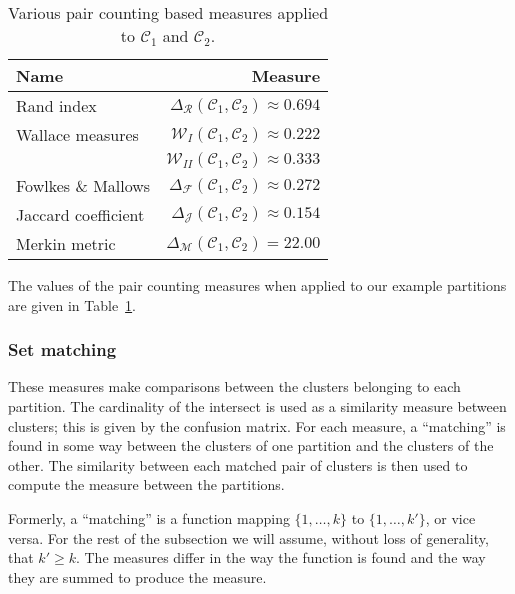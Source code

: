 \documentclass[a4paper]{report}
\newcommand{\clus}{\mathcal{C}}
\newcommand{\partcompare}[1]{\Delta_{\mathcal{#1}}(\clus_1,\clus_2)}
\begin{document}
\begin{table}
  \centering
  \begin{tabular}{lr}
    \toprule
    Name & Measure \\
    \midrule
    Rand index          & $\partcompare{R} \approx 0.694$ \\
    Wallace measures    & $\mathcal{W}_{I}(\clus_1,\clus_2) \approx 0.222$ \\
                        & $\mathcal{W}_{II}(\clus_1,\clus_2) \approx 0.333$ \\
    Fowlkes \& Mallows  & $\partcompare{F} \approx 0.272$ \\
    Jaccard coefficient & $\partcompare{J} \approx 0.154$ \\
    Merkin metric       & $\partcompare{M} = 22.00$ \\
    \bottomrule
  \end{tabular}
  \caption{Various pair counting based measures applied to $\clus_1$ and $\clus_2$.}
  \label{tab:pair-counting-comparison}
\end{table}

The values of the pair counting measures when applied to our example
partitions are given in Table~\ref{tab:pair-counting-comparison}.

\subsubsection{Set matching}
\label{sec:set-matching}

These measures make comparisons between the clusters belonging to each
partition.  The cardinality of the intersect is used as a similarity measure
between clusters; this is given by the confusion matrix.  For each measure, a
``matching'' is found in some way between the clusters of one partition and
the clusters of the other.  The similarity between each matched pair of
clusters is then used to compute the measure between the partitions.

Formerly, a ``matching'' is a function mapping $\{1,\dotsc,k\}$ to
$\{1,\dotsc,k'\}$, or vice versa.  For the rest of the subsection we will
assume, without loss of generality, that $k' \geq k$.  The measures differ in
the way the function is found and the way they are summed to produce the
measure.
\end{document}

